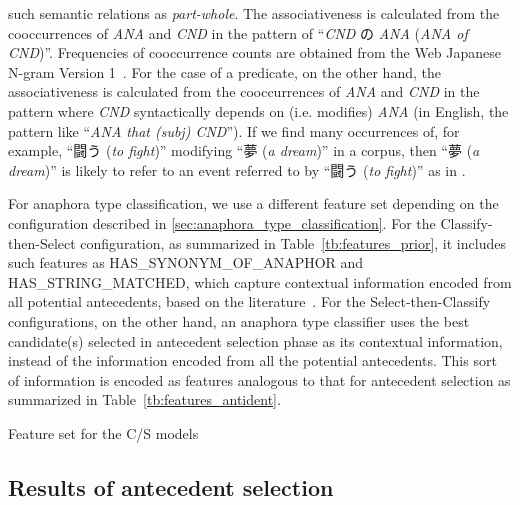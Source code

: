 \documentclass[english]{jnlp_1.4}
\begin{document}
\begin{itemize}
  such semantic relations as \emph{part-whole}. The associativeness is
  calculated from the cooccurrences of \emph{ANA} and \emph{CND} in
  the pattern of ``\emph{CND} の \emph{ANA} (\emph{ANA of
    CND})''. Frequencies of cooccurrence counts are obtained from the
  Web Japanese N-gram Version 1~.  For the case
  of a predicate, on the other hand, the associativeness is calculated
  from the cooccurrences of \emph{ANA} and \emph{CND} in the pattern
  where \emph{CND} syntactically depends on (i.e. modifies) \emph{ANA}
  (in English, the pattern like ``\textit{ANA that \textup{(}subj\textup{)} CND}''). If we
  find many occurrences of, for example, ``闘う (\emph{to fight})''
  modifying ``夢 (\emph{a dream})'' in a corpus, then ``夢 (\emph{a
    dream})'' is likely to refer to an event referred to by
  ``闘う (\emph{to fight})'' as in .
\end{itemize}

For anaphora type classification, we use a different feature set
depending on the configuration described in
\ref{sec:anaphora_type_classification}. For the Classify-then-Select
configuration, as summarized in Table~\ref{tb:features_prior}, it
includes such features as HAS\_SYNONYM\_OF\_ANAPHOR and
HAS\_STRING\_MATCHED, which capture contextual information encoded from
all potential antecedents,  based on the
literature~. For the
Select-then-Classify configurations, on the other hand, an anaphora
type classifier uses the best candidate(s) selected in antecedent
selection phase as its contextual information, instead of the
information encoded from all the potential antecedents. This sort of
information is encoded as features analogous to that for antecedent
selection as summarized in Table~\ref{tb:features_antident}.

\begin{table}[t]
\caption{Feature set for the C/S models}
\label{tb:features_prior}

\end{table}



\subsection{Results of antecedent selection} \label{sec:result_as}
\end{document}
